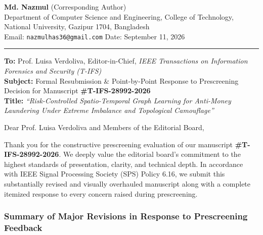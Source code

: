 \documentclass[9.5pt,a4paper]{article}
\begin{document}
\noindent
\textbf{Md. Nazmul} (Corresponding Author) \\
Department of Computer Science and Engineering, College of Technology, National University, Gazipur 1704, Bangladesh \\
Email: \texttt{nazmulhas36@gmail.com} \hfill Date: September 11, 2026

\vspace{0.08cm}
\hrule
\vspace{0.10cm}

\noindent
\textbf{To:} Prof. Luisa Verdoliva, Editor-in-Chief, \textit{IEEE Transactions on Information Forensics and Security (T-IFS)} \\
\textbf{Subject:} Formal Resubmission \& Point-by-Point Response to Prescreening Decision for Manuscript \textbf{\#T-IFS-28992-2026} \\
\textbf{Title:} \textit{``Risk-Controlled Spatio-Temporal Graph Learning for Anti-Money Laundering Under Extreme Imbalance and Topological Camouflage''}

\vspace{0.15cm}

\noindent
Dear Prof. Luisa Verdoliva and Members of the Editorial Board,

Thank you for the constructive prescreening evaluation of our manuscript \textbf{\#T-IFS-28992-2026}. We deeply value the editorial board's commitment to the highest standards of presentation, clarity, and technical depth. In accordance with IEEE Signal Processing Society (SPS) Policy 6.16, we submit this substantially revised and visually overhauled manuscript along with a complete itemized response to every concern raised during prescreening.

\subsubsection*{Summary of Major Revisions in Response to Prescreening Feedback}
\end{document}
